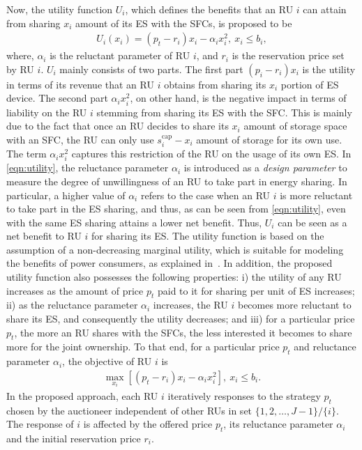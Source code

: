 \documentclass[journal,10pt]{IEEEtran}
\begin{document}
Now, the utility function $U_i$, which defines the benefits that an RU $i$ can attain from sharing $x_i$ amount of its ES with the SFCs, is proposed to be
\begin{eqnarray}
U_i(x_i) = (p_t - r_i)x_i - \alpha_i x_i^2,~x_i\leq b_i, \label{eqn:utility}
\end{eqnarray}
where, $\alpha_i$ is the reluctant parameter of RU $i$, and $r_i$ is the reservation price set by RU $i$. $U_i$ mainly consists of two parts. The first part $(p_i - r_i)x_i$ is the utility in terms of its revenue that an RU $i$ obtains from sharing its $x_i$ portion of ES device. The second part $\alpha_i x_i^2$, on other hand, is the negative impact in terms of liability on the RU $i$ stemming from sharing its ES with the SFC. This is mainly due to the fact that once an RU decides to share its $x_i$ amount of storage space with an SFC, the RU can only use $s_i^\text{cap} - x_i$ amount of storage for its own use. The term $\alpha_i x_i^2$ captures this restriction of the RU on the usage of its own ES. In \eqref{eqn:utility}, the reluctance parameter $\alpha_i$ is introduced as a \emph{design parameter} to measure the degree of unwillingness of an RU to take part in energy sharing. In particular, a higher value of $\alpha_i$ refers to the case when an RU $i$ is more reluctant to take part in the ES sharing, and thus, as can be seen from \eqref{eqn:utility}, even with the same ES sharing attains a lower net benefit. Thus, $U_i$ can be seen as a net benefit to RU $i$ for sharing its ES. The utility function is based on the assumption of a non-decreasing marginal utility, which is suitable for modeling the benefits of power consumers, as explained in~\cite{Samadi-C-Smartgridcomm:2010}. In addition, the proposed utility function also possesses the following properties: i)  the utility of any RU increases as the amount of price $p_t$ paid to it for sharing per unit of ES increases; ii) as the reluctance parameter $\alpha_i$ increases, the  RU $i$ becomes more reluctant to share its ES, and consequently the utility decreases; and iii) for a particular price $p_t$, the more an RU shares with the SFCs, the less interested it becomes to share more for the joint ownership. To that end, for a particular price $p_t$ and reluctance parameter $\alpha_i$, the objective of RU $i$ is
\begin{eqnarray}
\max_{x_i}\left[ (p_t - r_i)x_i - \alpha_i x_i^2\right],~x_i\leq b_i.\label{eqn:obj-RU}
\end{eqnarray}
In the proposed approach, each RU $i$ iteratively responses to the strategy $p_t$ chosen by the auctioneer independent of other RUs in set $\{1, 2, \hdots, J-1\}/\{i\}$. The response of $i$ is affected by the offered price $p_t$, its reluctance parameter $\alpha_i$ and the initial reservation price $r_i$.
\end{document}
